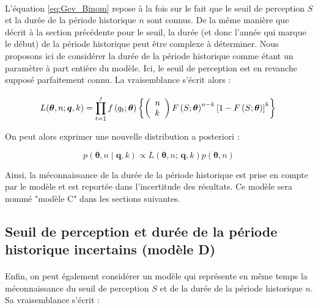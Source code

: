 \documentclass[11pt]{article}
\begin{document}
		\paragraph{}
		L'équation \ref{eq:Gev_Binom} repose à la fois sur le fait que le seuil de perception $S$ et la durée de la période historique $n$ sont connus. De la même manière que décrit à la section précédente pour le seuil, la durée (et donc l'année qui marque le début) de la période historique peut être complexe à déterminer. Nous proposons ici de considérer la durée de la période historique comme étant un paramètre à part entière du modèle. Ici, le seuil de perception est en revanche supposé parfaitement connu. La vraisemblance s'écrit alors : 
		 
				\begin{equation}
				L(\boldsymbol{\theta}, n ; \boldsymbol{q}, k) = \prod_{t=1}^j f\left(q_t;\boldsymbol{\theta}\right) \left\{\left(\begin{array}{l}
				n \\
				k
				\end{array}\right) F\left(S;\boldsymbol{\theta}\right)^{n-k}\left[1-F\left(S;\boldsymbol{\theta}\right)\right]^k\right\} \\
				\label{eq:Gev_Binom_uN}
				\end{equation}
				
		On peut alors exprimer une nouvelle distribution a posteriori :
		
				\begin{equation}
					p(\boldsymbol{\theta}, n \mid \boldsymbol{q},k) \propto L(\boldsymbol{\theta},n;\,\boldsymbol{q},k) p(\boldsymbol{\theta},n)
					\label{eq:Bayes_uN}
				\end{equation}
			
		Ainsi, la méconnaissance de la durée de la période historique est prise en compte par le modèle et est reportée dans l'incertitude des résultats. Ce modèle sera nommé "modèle C" dans les sections suivantes. 
	
	\subsection{Seuil de perception et durée de la période historique incertains (modèle D)}
	
	\paragraph{}
	Enfin, on peut également considérer un modèle qui représente en même temps la méconnaissance du seuil de perception $S$ et de la durée de la période historique $n$. Sa vraisemblance s'écrit :  
	
\end{document}
